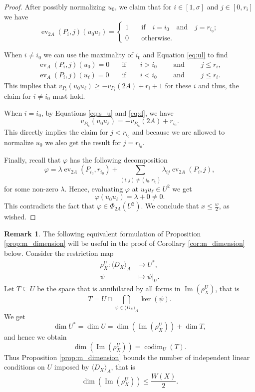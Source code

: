 \documentclass[12pt]{amsart}
\renewcommand{\leq}{\leqslant}
\renewcommand{\geq}{\geqslant}
\DeclareMathOperator{\ev}{ev}
\theoremstyle{definition}
\newtheorem{remark}[theorem]{Remark}
\newcommand{\divi}[1]{\langle #1 \rangle}
\begin{document}
\begin{proof}
		After possibly normalizing $u_0$, we claim that for $i \in [1, \sigma]$ and $j \in [0, r_i]$ we have
		$$ \ev_{ 2A}(P_i,j) (u_0 u_\ell) = \begin{cases}
			1 &\quad \text{if}\quad i=i_0 \quad\text{and}\quad j=r_{i_0};\\0& \quad\text{otherwise}.
		\end{cases}$$
		
		When $i \neq i_0$ we can use the maximality of $i_0$ and Equation \eqref{eq:ul} to find
		\begin{align*}\ev_A(P_i,j) (u_0) =0 
			&\quad\text{if}\qquad i> i_0 \qquad \text{ and } \qquad  j\le r_i,\\
			\ev_A(P_i,j) (u_\ell) =0 &\quad\text{if}\qquad i< i_0 \qquad \text{ and } \qquad j\le r_i.
		\end{align*}
		This implies that $v_{P_i}(u_0 u_\ell) \geq -v_{P_i}(2A) + r_i + 1$ for these $i$ and thus, the claim for $i \neq i_0$ must hold.
		
		When $i = i_0$, by Equations \eqref{eq:s_u} and \eqref{eq:d}, 
		we have 
		$$ v_{P_{i_0}}(u_0 u_\ell) = -v_{P_{i_0}}(2A)+ r_{i_0}.  $$ 
		This directly implies the claim for $j < r_{i_0}$ and because we are allowed to normalize $u_0$ we also get the result for $j = r_{i_0}$. 
		
		Finally, recall that $\varphi$ has the following decomposition
		$$\varphi = \lambda \ev_{2A} (P_{i_0} ,  r_{i_0}) + \sum_{ (i,j)\neq (i_0,r_{i_0})}\lambda_{i j} \ev_{2A}(P_i,j ), $$
		for some non-zero $\lambda$. Hence, evaluating $\varphi$ at
		$u_0 u_\ell \in U^2$ we get
		$$\varphi (u_0 u_\ell) = \lambda + 0\neq 0. $$
		This contradicts the fact that $\varphi\in \Phi_{2A}(U^2).$ We conclude that $x \leq \frac w2$, as wished.
	\end{proof}
	
	\begin{remark} \label{rem:reform}
		The following equivalent formulation of Proposition \ref{prop:m_dimension} will be useful in the proof of Corollary \ref{cor:m_dimension} below. Consider the restriction map
		\begin{align*}
			\rho_X^U:\divi{D_X}_A &\longrightarrow U^*, \\
			\psi &\longmapsto \psi|_U .
		\end{align*}
		Let $T \subseteq U$ be the space that is annihilated by all forms in $\operatorname{Im}(\rho_X^U)$, that is
		$$T= U\cap\bigcap_{\psi\in\divi{D_X}_A }\ker(\psi). $$
		We get
		$$ \dim U^\ast = \dim U= \dim \left(\operatorname{Im}(\rho_X^U) \right)+ \dim T,  $$
		and hence we obtain
		$$\dim \left(\operatorname{Im} (\rho_X^U ) \right) = \operatorname{codim}_U (T). $$
		Thus Proposition \ref{prop:m_dimension} bounds the number of independent linear conditions on $U$ imposed by $\divi{D_X}_A$, that is
		$$\dim \left(\operatorname{Im}(\rho_X^U)\right) \leq \frac{W(X)}{2}. $$
	\end{remark}
	
\end{document}
